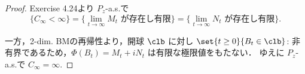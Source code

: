 \documentclass{jsarticle}
\begin{document}
\begin{proof}
    Exercise 4.24より $P_z$-a.s.で
    $$
    \{C_\infty<\infty\}
    = \{\lim_{t\to\infty}M_t\text{ が存在し有限}\}
    = \{\lim_{t\to\infty}N_t\text{ が存在し有限}\}.
    $$
    
    一方，2-dim. BMの再帰性より，開球 $\clb$ に対し $\set{t\ge0}{B_t\in\clb}$: 非有界であるため，$\Phi(B_t)=M_t+iN_t$ は有限な極限値をもたない．
    ゆえに $P_z$-a.s.で $C_\infty=\infty.$
\end{proof}
\end{document}
